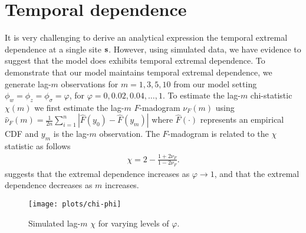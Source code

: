 \section{Temporal dependence} \label{sta:temporal}
It is very challenging to derive an analytical expression the temporal extremal dependence at a single site $\mathbf{s}$.
However, using simulated data, we have evidence to suggest that the model does exhibits temporal extremal dependence.
To demonstrate that our model maintains temporal extremal dependence, we generate lag-$m$ observations for $m = 1, 3, 5, 10$ from our model setting $\phi_w = \phi_z = \phi_\sigma = \varphi$, for $\varphi = 0, 0.02, 0.04, \ldots, 1$.
To estimate the lag-$m$ chi-statistic $\chi(m)$ we first estimate the lag-$m$ $F$-madogram $\nu_F(m)$ \citep{Cooley2006} using $\hat{\nu}_F(m) = \displaystyle \frac{1}{2n} \sum_{i = 1}^n \left| \hat{F}(y_{0}) - \hat{F}(y_{m}) \right|$ where $\hat{F}(\cdot)$ represents an empirical CDF and $y_m$ is the lag-$m$ observation.
The $F$-madogram is related to the $\chi$ statistic as follows
\begin{align}
  \chi = 2 - \frac{1 + 2 \nu_F}{1 - 2 \nu_F}.
\end{align}
 suggests that the extremal dependence increases as $\varphi \rightarrow 1$, and that the extremal dependence decreases as $m$ increases.
\begin{figure}
  \centering
  \texttt{[image: plots/chi-phi]}
  \caption{Simulated lag-$m$ $\chi$ for varying levels of $\varphi$.}
  \label{stfig:chiphi}
\end{figure}



